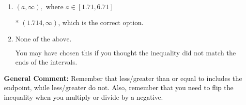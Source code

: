 \documentclass{extbook}[14pt]
\begin{document}
\begin{enumerate}
{\begin{enumerate}[label=\Alph*.]
 $(-\infty, -1.714)$, which corresponds to switching the direction of the interval AND negating the endpoint. You likely did this if you did not flip the inequality when dividing by a negative as well as not moving values over to a side properly.
\item \( (a, \infty), \text{ where } a \in [1.71, 6.71] \)

* $(1.714, \infty)$, which is the correct option.
\item \( \text{None of the above}. \)

You may have chosen this if you thought the inequality did not match the ends of the intervals.
\end{enumerate}

\textbf{General Comment:} Remember that less/greater than or equal to includes the endpoint, while less/greater do not. Also, remember that you need to flip the inequality when you multiply or divide by a negative.
}
\end{enumerate}
\end{document}
